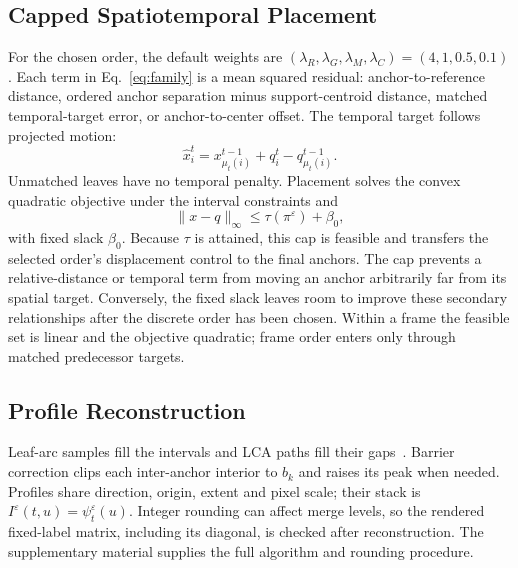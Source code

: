 \documentclass[review]{vgtc}
\begin{document}
\subsection{Capped Spatiotemporal Placement}
For the chosen order, the default weights are $(\lambda_R,\lambda_G,\lambda_M,\lambda_C)=(4,1,0.5,0.1)$. Each term in Eq.~\ref{eq:family} is a mean squared residual: anchor-to-reference distance, ordered anchor separation minus support-centroid distance, matched temporal-target error, or anchor-to-center offset. The temporal target follows projected motion:
\begin{equation}\label{eq:temporal_target}
\hat x_i^t=x_{\mu_t(i)}^{t-1}+q_i^t-q_{\mu_t(i)}^{t-1}.
\end{equation}
Unmatched leaves have no temporal penalty. Placement solves the convex quadratic objective under the interval constraints and
\begin{equation}\label{eq:qp}
\|x-q\|_\infty\le\tau(\pi^\varepsilon)+\beta_0,
\end{equation}
with fixed slack $\beta_0$. Because $\tau$ is attained, this cap is feasible and transfers the selected order's displacement control to the final anchors. The cap prevents a relative-distance or temporal term from moving an anchor arbitrarily far from its spatial target. Conversely, the fixed slack leaves room to improve these secondary relationships after the discrete order has been chosen. Within a frame the feasible set is linear and the objective quadratic; frame order enters only through matched predecessor targets.

\subsection{Profile Reconstruction}
Leaf-arc samples fill the intervals and LCA paths fill their gaps~\cite{Koepp:2023:TMTM,STMTM:2026}. Barrier correction clips each inter-anchor interior to $b_k$ and raises its peak when needed. Profiles share direction, origin, extent and pixel scale; their stack is $I^\varepsilon(t,u)=\psi_t^\varepsilon(u)$. Integer rounding can affect merge levels, so the rendered fixed-label matrix, including its diagonal, is checked after reconstruction. The supplementary material supplies the full algorithm and rounding procedure.
\end{document}
